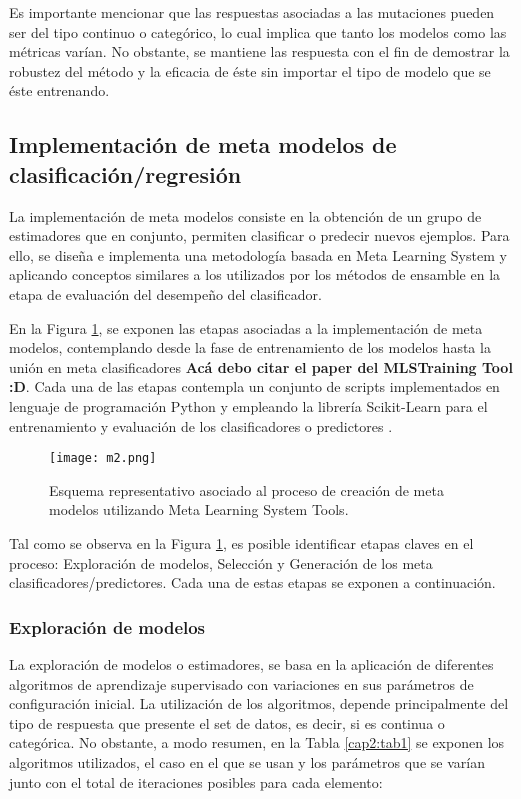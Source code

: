 Es importante mencionar que las respuestas asociadas a las mutaciones pueden ser del tipo continuo o categórico, lo cual implica que tanto los modelos como las métricas varían. No obstante, se mantiene las respuesta con el fin de demostrar la robustez del método y la eficacia de éste sin importar el tipo de modelo que se éste entrenando.

\subsection{Implementación de meta modelos de clasificación/regresión}

La implementación de meta modelos consiste en la obtención de un grupo de estimadores que en conjunto, permiten clasificar o predecir nuevos ejemplos. Para ello, se diseña e implementa una metodología basada en Meta Learning System y aplicando conceptos similares a los utilizados por los métodos de ensamble en la etapa de evaluación del desempeño del clasificador.

En la Figura \ref{C2:M2}, se exponen las etapas asociadas a la implementación de meta modelos, contemplando desde la fase de entrenamiento de los modelos hasta la unión en meta clasificadores \textbf{Acá debo citar el paper del MLSTraining Tool :D}. Cada una de las etapas contempla un conjunto de scripts implementados en lenguaje de programación Python y empleando la librería Scikit-Learn para el entrenamiento y evaluación de los clasificadores o predictores \cite{pedregosa2011scikit}.


\begin{figure}[!h]
	\centering
	\texttt{[image: m2.png]}
	\caption{Esquema representativo asociado al proceso de creación de meta modelos utilizando Meta Learning System Tools.}
	\label{C2:M2}
\end{figure}

Tal como se observa en la Figura \ref{C2:M2}, es posible identificar etapas claves en el proceso: Exploración de modelos, Selección y Generación de los meta clasificadores/predictores. Cada una de estas etapas se exponen a continuación.

\subsubsection{Exploración de modelos}

La exploración de modelos o estimadores, se basa en la aplicación de diferentes algoritmos de aprendizaje supervisado con variaciones en sus parámetros de configuración inicial. La utilización de los algoritmos, depende principalmente del tipo de respuesta que presente el set de datos, es decir, si es continua o categórica. No obstante, a modo resumen, en la Tabla \ref{cap2:tab1} se exponen los algoritmos utilizados, el caso en el que se usan y los parámetros que se varían junto con el total de iteraciones posibles para cada elemento:

